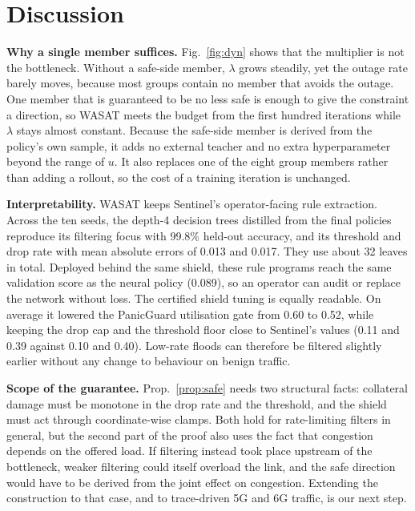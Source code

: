 \documentclass[journal]{IEEEtran}
\begin{document}
\section{Discussion}
\textbf{Why a single member suffices.} Fig.~\ref{fig:dyn} shows that the multiplier is not the bottleneck. Without a safe-side member, $\lambda$ grows steadily, yet the outage rate barely moves, because most groups contain no member that avoids the outage. One member that is guaranteed to be no less safe is enough to give the constraint a direction, so WASAT meets the budget from the first hundred iterations while $\lambda$ stays almost constant. Because the safe-side member is derived from the policy's own sample, it adds no external teacher and no extra hyperparameter beyond the range of $u$. It also replaces one of the eight group members rather than adding a rollout, so the cost of a training iteration is unchanged.

\textbf{Interpretability.} WASAT keeps Sentinel's operator-facing rule extraction. Across the ten seeds, the depth-4 decision trees distilled from the final policies reproduce its filtering focus with 99.8\% held-out accuracy, and its threshold and drop rate with mean absolute errors of 0.013 and 0.017. They use about 32 leaves in total. Deployed behind the same shield, these rule programs reach the same validation score as the neural policy (0.089), so an operator can audit or replace the network without loss. The certified shield tuning is equally readable. On average it lowered the PanicGuard utilisation gate from 0.60 to 0.52, while keeping the drop cap and the threshold floor close to Sentinel's values (0.11 and 0.39 against 0.10 and 0.40). Low-rate floods can therefore be filtered slightly earlier without any change to behaviour on benign traffic.

\textbf{Scope of the guarantee.} Prop.~\ref{prop:safe} needs two structural facts: collateral damage must be monotone in the drop rate and the threshold, and the shield must act through coordinate-wise clamps. Both hold for rate-limiting filters in general, but the second part of the proof also uses the fact that congestion depends on the offered load. If filtering instead took place upstream of the bottleneck, weaker filtering could itself overload the link, and the safe direction would have to be derived from the joint effect on congestion. Extending the construction to that case, and to trace-driven 5G and 6G traffic, is our next step.
\end{document}
